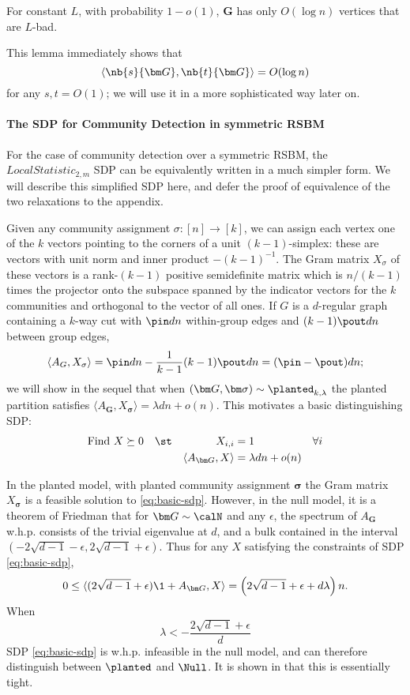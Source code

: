 \begin{lemma}    \label{lem:L-bad-bound}
    For constant $L$, with probability $1 - o(1)$, $\bm G$ has only $O(\log n)$ vertices that are $L$-bad.
\end{lemma}

\noindent This lemma immediately shows that
$$
    \langle \nb{s}{\bm G},\nb{t}{\bm G} \rangle = O(\log n)
$$
for any $s,t = O(1)$; we will use it in a more sophisticated way later on.

\paragraph{The SDP for Community Detection in symmetric RSBM}

For the case of community detection over a symmetric RSBM, the $LocalStatistic_{2,m}$ SDP can be equivalently written in a much simpler form.
%
We will describe this simplified SDP here, and defer the proof of equivalence of the two relaxations to the appendix.

%
Given any community assignment $\sigma: [n] \to [k]$, we can assign each vertex one of the $k$ vectors pointing to the corners of a unit $(k-1)$-simplex: these are vectors with unit norm and inner product $-(k-1)^{-1}$. The Gram matrix $X_\sigma$ of these vectors is a rank-$(k-1)$ positive semidefinite matrix which is $n/(k-1)$ times the projector onto the subspace spanned by the indicator vectors for the $k$ communities and orthogonal to the vector of all ones. If $G$ is a $d$-regular graph containing a $k$-way cut with $\pin d n$ within-group edges and $(k-1)\pout d n$ between group edges, 
$$
    \langle A_{G}, X_\sigma \rangle = \pin d n - \frac{1}{k-1}(k-1)\pout d n = (\pin - \pout)dn;
$$
we will show in the sequel that when $(\bm G, \bm \sigma) \sim \planted_{k,\lambda}$ the planted partition satisfies $\langle A_{\bm G}, X_{\bm \sigma}\rangle = \lambda d n + o(n)$. This motivates a basic distinguishing SDP:
\begin{align} \label{eq:basic-sdp}
    \text{Find  } X &\succeq 0 & &\st & X_{i,i} &= 1  & & \forall i\\ 
    & & & & \langle A_{\bm G}, X \rangle &= \lambda d n + o(n) & & \noindent
\end{align}

In the planted model, with planted community assignment $\bm \sigma$ the Gram matrix $X_{\bm \sigma}$ is a feasible solution to \eqref{eq:basic-sdp}. However, in the null model, it is a theorem of Friedman \cite{friedman2003proof} that for $\bm G \sim \calN$ and any $\epsilon$, the spectrum of $A_{\bm G}$ w.h.p. consists of the trivial eigenvalue at $d$, and a bulk contained in the interval $(-2\sqrt{d-1} - \epsilon,2\sqrt{d-1} + \epsilon)$. Thus for any $X$ satisfying the constraints of SDP \eqref{eq:basic-sdp},
\[
	0 \le \langle  (2\sqrt{d-1} + \epsilon)\1 + A_{\bm G}, X \rangle = \left(2\sqrt{d-1} + \epsilon +d\lambda\right)n.
\]
When
\[
	\lambda < -\frac{2\sqrt{d-1} + \epsilon}{d}
\]
SDP \eqref{eq:basic-sdp} is w.h.p. infeasible in the null model, and can therefore distinguish between $\planted$ and $\Null$. It is shown in \cite{banks2017lov} that this is essentially tight.

